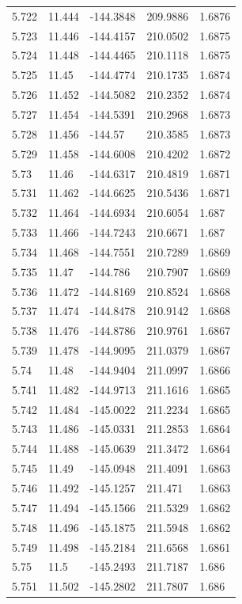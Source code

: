 \begin{tabular}{lllll}
5.722 & 11.444 & -144.3848 & 209.9886 & 1.6876 \\
5.723 & 11.446 & -144.4157 & 210.0502 & 1.6875 \\
5.724 & 11.448 & -144.4465 & 210.1118 & 1.6875 \\
5.725 & 11.45 & -144.4774 & 210.1735 & 1.6874 \\
5.726 & 11.452 & -144.5082 & 210.2352 & 1.6874 \\
5.727 & 11.454 & -144.5391 & 210.2968 & 1.6873 \\
5.728 & 11.456 & -144.57 & 210.3585 & 1.6873 \\
5.729 & 11.458 & -144.6008 & 210.4202 & 1.6872 \\
5.73 & 11.46 & -144.6317 & 210.4819 & 1.6871 \\
5.731 & 11.462 & -144.6625 & 210.5436 & 1.6871 \\
5.732 & 11.464 & -144.6934 & 210.6054 & 1.687 \\
5.733 & 11.466 & -144.7243 & 210.6671 & 1.687 \\
5.734 & 11.468 & -144.7551 & 210.7289 & 1.6869 \\
5.735 & 11.47 & -144.786 & 210.7907 & 1.6869 \\
5.736 & 11.472 & -144.8169 & 210.8524 & 1.6868 \\
5.737 & 11.474 & -144.8478 & 210.9142 & 1.6868 \\
5.738 & 11.476 & -144.8786 & 210.9761 & 1.6867 \\
5.739 & 11.478 & -144.9095 & 211.0379 & 1.6867 \\
5.74 & 11.48 & -144.9404 & 211.0997 & 1.6866 \\
5.741 & 11.482 & -144.9713 & 211.1616 & 1.6865 \\
5.742 & 11.484 & -145.0022 & 211.2234 & 1.6865 \\
5.743 & 11.486 & -145.0331 & 211.2853 & 1.6864 \\
5.744 & 11.488 & -145.0639 & 211.3472 & 1.6864 \\
5.745 & 11.49 & -145.0948 & 211.4091 & 1.6863 \\
5.746 & 11.492 & -145.1257 & 211.471 & 1.6863 \\
5.747 & 11.494 & -145.1566 & 211.5329 & 1.6862 \\
5.748 & 11.496 & -145.1875 & 211.5948 & 1.6862 \\
5.749 & 11.498 & -145.2184 & 211.6568 & 1.6861 \\
5.75 & 11.5 & -145.2493 & 211.7187 & 1.686 \\
5.751 & 11.502 & -145.2802 & 211.7807 & 1.686 \\

\end{tabular}
